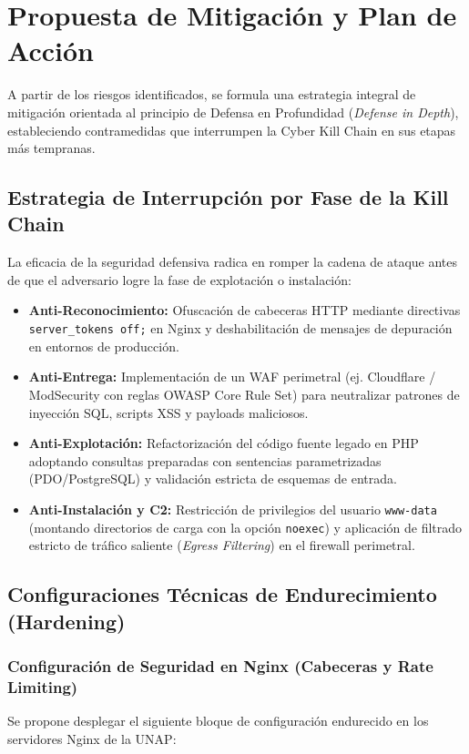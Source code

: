 \chapter{Propuesta de Mitigación y Plan de Acción}
\label{ch:mitigacion}

A partir de los riesgos identificados, se formula una estrategia integral de mitigación orientada al principio de Defensa en Profundidad (\textit{Defense in Depth}), estableciendo contramedidas que interrumpen la Cyber Kill Chain en sus etapas más tempranas.

\section{Estrategia de Interrupción por Fase de la Kill Chain}
La eficacia de la seguridad defensiva radica en romper la cadena de ataque antes de que el adversario logre la fase de explotación o instalación:

\begin{itemize}
    \item \textbf{Anti-Reconocimiento:} Ofuscación de cabeceras HTTP mediante directivas \texttt{server\_tokens off;} en Nginx y deshabilitación de mensajes de depuración en entornos de producción.
    \item \textbf{Anti-Entrega:} Implementación de un WAF perimetral (ej. Cloudflare / ModSecurity con reglas OWASP Core Rule Set) para neutralizar patrones de inyección SQL, scripts XSS y payloads maliciosos.
    \item \textbf{Anti-Explotación:} Refactorización del código fuente legado en PHP adoptando consultas preparadas con sentencias parametrizadas (PDO/PostgreSQL) y validación estricta de esquemas de entrada.
    \item \textbf{Anti-Instalación y C2:} Restricción de privilegios del usuario \texttt{www-data} (montando directorios de carga con la opción \texttt{noexec}) y aplicación de filtrado estricto de tráfico saliente (\textit{Egress Filtering}) en el firewall perimetral.
\end{itemize}

\section{Configuraciones Técnicas de Endurecimiento (Hardening)}

\subsection{Configuración de Seguridad en Nginx (Cabeceras y Rate Limiting)}
Se propone desplegar el siguiente bloque de configuración endurecido en los servidores Nginx de la UNAP:

